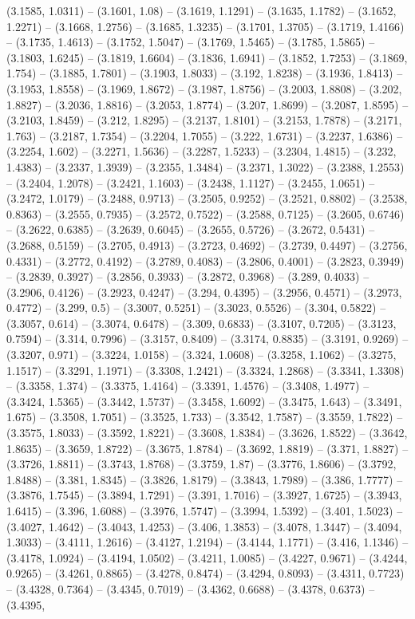(3.1585, 1.0311) -- (3.1601, 1.08) -- (3.1619, 1.1291) -- (3.1635, 1.1782) -- (3.1652, 1.2271) -- (3.1668, 1.2756) -- (3.1685, 1.3235) -- (3.1701, 1.3705) -- (3.1719, 1.4166) -- (3.1735, 1.4613) -- (3.1752, 1.5047) -- (3.1769, 1.5465) -- (3.1785, 1.5865) -- (3.1803, 1.6245) -- (3.1819, 1.6604) -- (3.1836, 1.6941) -- (3.1852, 1.7253) -- (3.1869, 1.754) -- (3.1885, 1.7801) -- (3.1903, 1.8033) -- (3.192, 1.8238) -- (3.1936, 1.8413) -- (3.1953, 1.8558) -- (3.1969, 1.8672) -- (3.1987, 1.8756) -- (3.2003, 1.8808) -- (3.202, 1.8827) -- (3.2036, 1.8816) -- (3.2053, 1.8774) -- (3.207, 1.8699) -- (3.2087, 1.8595) -- (3.2103, 1.8459) -- (3.212, 1.8295) -- (3.2137, 1.8101) -- (3.2153, 1.7878) -- (3.2171, 1.763) -- (3.2187, 1.7354) -- (3.2204, 1.7055) -- (3.222, 1.6731) -- (3.2237, 1.6386) -- (3.2254, 1.602) -- (3.2271, 1.5636) -- (3.2287, 1.5233) -- (3.2304, 1.4815) -- (3.232, 1.4383) -- (3.2337, 1.3939) -- (3.2355, 1.3484) -- (3.2371, 1.3022) -- (3.2388, 1.2553) -- (3.2404, 1.2078) -- (3.2421, 1.1603) -- (3.2438, 1.1127) -- (3.2455, 1.0651) -- (3.2472, 1.0179) -- (3.2488, 0.9713) -- (3.2505, 0.9252) -- (3.2521, 0.8802) -- (3.2538, 0.8363) -- (3.2555, 0.7935) -- (3.2572, 0.7522) -- (3.2588, 0.7125) -- (3.2605, 0.6746) -- (3.2622, 0.6385) -- (3.2639, 0.6045) -- (3.2655, 0.5726) -- (3.2672, 0.5431) -- (3.2688, 0.5159) -- (3.2705, 0.4913) -- (3.2723, 0.4692) -- (3.2739, 0.4497) -- (3.2756, 0.4331) -- (3.2772, 0.4192) -- (3.2789, 0.4083) -- (3.2806, 0.4001) -- (3.2823, 0.3949) -- (3.2839, 0.3927) -- (3.2856, 0.3933) -- (3.2872, 0.3968) -- (3.289, 0.4033) -- (3.2906, 0.4126) -- (3.2923, 0.4247) -- (3.294, 0.4395) -- (3.2956, 0.4571) -- (3.2973, 0.4772) -- (3.299, 0.5) -- (3.3007, 0.5251) -- (3.3023, 0.5526) -- (3.304, 0.5822) -- (3.3057, 0.614) -- (3.3074, 0.6478) -- (3.309, 0.6833) -- (3.3107, 0.7205) -- (3.3123, 0.7594) -- (3.314, 0.7996) -- (3.3157, 0.8409) -- (3.3174, 0.8835) -- (3.3191, 0.9269) -- (3.3207, 0.971) -- (3.3224, 1.0158) -- (3.324, 1.0608) -- (3.3258, 1.1062) -- (3.3275, 1.1517) -- (3.3291, 1.1971) -- (3.3308, 1.2421) -- (3.3324, 1.2868) -- (3.3341, 1.3308) -- (3.3358, 1.374) -- (3.3375, 1.4164) -- (3.3391, 1.4576) -- (3.3408, 1.4977) -- (3.3424, 1.5365) -- (3.3442, 1.5737) -- (3.3458, 1.6092) -- (3.3475, 1.643) -- (3.3491, 1.675) -- (3.3508, 1.7051) -- (3.3525, 1.733) -- (3.3542, 1.7587) -- (3.3559, 1.7822) -- (3.3575, 1.8033) -- (3.3592, 1.8221) -- (3.3608, 1.8384) -- (3.3626, 1.8522) -- (3.3642, 1.8635) -- (3.3659, 1.8722) -- (3.3675, 1.8784) -- (3.3692, 1.8819) -- (3.371, 1.8827) -- (3.3726, 1.8811) -- (3.3743, 1.8768) -- (3.3759, 1.87) -- (3.3776, 1.8606) -- (3.3792, 1.8488) -- (3.381, 1.8345) -- (3.3826, 1.8179) -- (3.3843, 1.7989) -- (3.386, 1.7777) -- (3.3876, 1.7545) -- (3.3894, 1.7291) -- (3.391, 1.7016) -- (3.3927, 1.6725) -- (3.3943, 1.6415) -- (3.396, 1.6088) -- (3.3976, 1.5747) -- (3.3994, 1.5392) -- (3.401, 1.5023) -- (3.4027, 1.4642) -- (3.4043, 1.4253) -- (3.406, 1.3853) -- (3.4078, 1.3447) -- (3.4094, 1.3033) -- (3.4111, 1.2616) -- (3.4127, 1.2194) -- (3.4144, 1.1771) -- (3.416, 1.1346) -- (3.4178, 1.0924) -- (3.4194, 1.0502) -- (3.4211, 1.0085) -- (3.4227, 0.9671) -- (3.4244, 0.9265) -- (3.4261, 0.8865) -- (3.4278, 0.8474) -- (3.4294, 0.8093) -- (3.4311, 0.7723) -- (3.4328, 0.7364) -- (3.4345, 0.7019) -- (3.4362, 0.6688) -- (3.4378, 0.6373) -- (3.4395, 